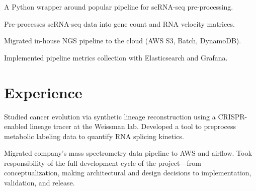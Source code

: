 \documentclass[]{resume}
\begin{document}
\begin{minipage}[t]{0.69\textwidth}
\begin{tightemize}
\item A Python wrapper around popular pipeline for scRNA-seq pre-processing.
\item Pre-processes scRNA-seq data into gene count and RNA velocity matrices.
\end{tightemize}
\sectionsep

\begin{tightemize}
\item Migrated in-house NGS pipeline to the cloud (AWS S3, Batch, DynamoDB).
\item Implemented pipeline metrics collection with Elasticsearch and Grafana.
\end{tightemize}
\sectionsep


\section{Experience}
Studied cancer evolution via synthetic lineage reconstruction using a CRISPR-enabled lineage tracer at the Weissman lab. Developed a tool to preprocess metabolic labeling data to quantify RNA splicing kinetics.
\sectionsep

Migrated company's mass spectrometry data pipeline to AWS and airflow. Took responsibility of the full development cycle of the project---from conceptualization, making architectural and design decisions to implementation, validation, and release.
\sectionsep


\end{minipage}
\end{document}
